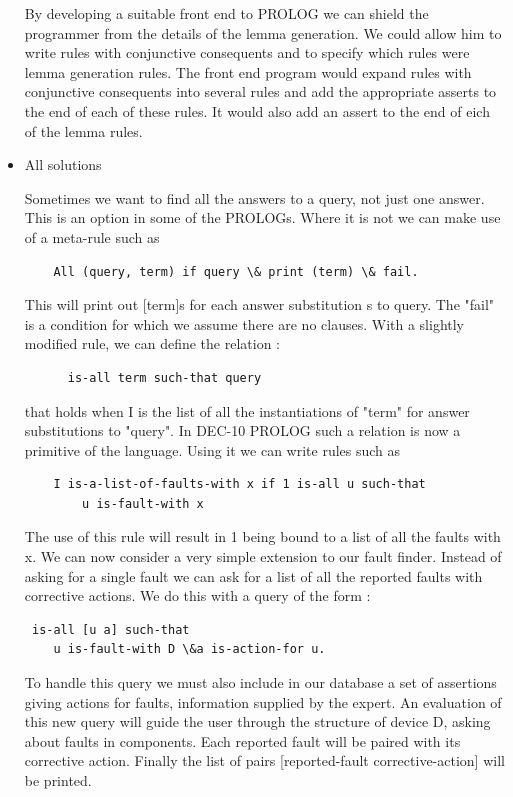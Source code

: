 \documentclass[14pt]{article}
\begin{document}
\begin{itemize}
By developing a suitable front end to PROLOG we can shield the programmer from the details of the lemma generation. We could allow him to write rules with conjunctive consequents and to specify which rules were lemma generation rules. The front end program would expand rules with conjunctive consequents into several rules and add the appropriate asserts to the end of each of these rules. It would also add an assert to the end of eich of the lemma rules.

\item All solutions 

Sometimes we want to find all the answers to a query, not just one answer. This is an option in some of the PROLOGs. Where it is not we can make use of a meta-rule such as 
\begin{verbatim}
	All (query, term) if query \& print (term) \& fail.
\end{verbatim}
This will print out [term]s for each answer substitution s to query. 
The "fail" is a condition for which we assume there are no clauses. 
With a slightly modified rule, we can define the relation :
\begin{verbatim}	
	  is-all term such-that query 
\end{verbatim}
that holds when I is the list of all the instantiations of "term" for answer substitutions to "query". In DEC-10 PROLOG such a relation is now a primitive of the language. Using it we can write rules such as 
\begin{verbatim}
	I is-a-list-of-faults-with x if 1 is-all u such-that 
		u is-fault-with x 
\end{verbatim}
The use of this rule will result in 1 being bound to a list of all the 
faults with x. We can now consider a very simple extension to our fault 
finder. Instead of asking for a single fault we can ask for a list of all the reported faults with corrective actions. We do this with a query of the form : 
\begin{verbatim}
 is-all [u a] such-that 
	u is-fault-with D \&a is-action-for u. 
\end{verbatim}

To handle this query we must also include in our database a set of assertions giving actions for faults, information supplied by the expert. An evaluation of this new query will guide the user through the structure of device D, asking about faults in components. Each reported fault will be paired with its corrective action. Finally the list of pairs [reported-fault corrective-action] will be printed.


\end{itemize}
\end{document}
